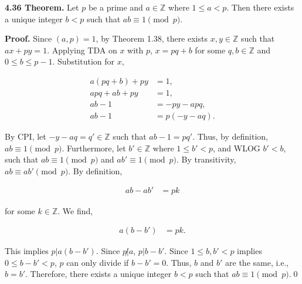 \documentclass[12pt]{article}
\begin{document}
\noindent\textbf{4.36 Theorem.} Let $p$ be a prime and $a\in\mathbb{Z}$ where $1\leq a <p$. Then there exists a unique integer $b< p$ such that $ab\equiv 1\pmod p$.

\bigskip

\noindent\textbf{Proof.} Since $(a,p)=1$, by Theorem 1.38, there exists $x,y\in\mathbb{Z}$ such that $ax+py=1$. Applying TDA on $x$ with $p$, $x=pq+b$ for some $q,b\in\mathbb{Z}$ and $0\leq b \leq p-1$. Substitution for $x$,

\begin{align*}
a(pq+b)+py&=1, \\
apq + ab + py &= 1, \\
ab-1&= -py-apq, \\
ab-1&=p(-y-aq).
\end{align*}

\noindent By CPI, let $-y-aq=q'\in\mathbb{Z}$ such that $ab-1=pq'$. Thus, by definition, $ab\equiv 1\pmod p$. Furthermore, let $b'\in\mathbb{Z}$ where $1\leq b' < p$, and WLOG $b'<b$, such that $ab\equiv 1\pmod p$ and $ab'\equiv 1\pmod p$. By transitivity, $ab\equiv ab'\pmod p$. By definition,

\begin{align*}
ab-ab' &= pk
\end{align*}

\noindent for some $k\in\mathbb{Z}$. We find,

\begin{align*}
a(b-b')&=pk.
\end{align*}

\noindent This implies $p|a(b-b')$. Since $p\not|a$, $p|b-b'$. Since $1\leq b,b' <p$ implies $0\leq b-b' < p$, $p$ can only divide if $b-b'=0$. Thus, $b$ and $b'$ are the same, i.e., $b=b'$. Therefore, there exists a unique integer $b < p$ such that $ab\equiv 1\pmod p$.\qed
\end{document}
